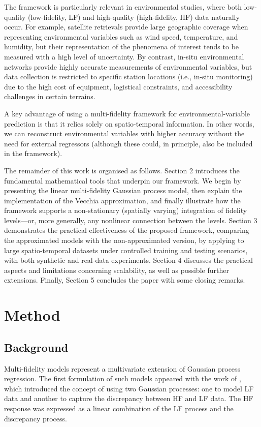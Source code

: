\documentclass[12pt]{article}
\begin{document}
The framework is particularly relevant in environmental studies, where both low-quality (low-fidelity, LF) and high-quality (high-fidelity, HF) data naturally occur. For example, satellite retrievals provide large geographic coverage when representing environmental variables such as wind speed, temperature, and humidity, but their representation of the phenomena of interest tends to be measured with a high level of uncertainty. By contrast, in-situ environmental networks provide highly accurate measurements of environmental variables, but data collection is restricted to specific station locations (i.e., in-situ monitoring) due to the high cost of equipment, logistical constraints, and accessibility challenges in certain terrains.

\noindent
\hangindent=-5mm
A key advantage of using a multi-fidelity framework for environmental-variable prediction is that it relies solely on spatio-temporal information. In other words, we can reconstruct environmental variables with higher accuracy without the need for external regressors (although these could, in principle, also be included in the framework).

\noindent
\hangindent=-5mm
The remainder of this work is organised as follows. Section 2 introduces the fundamental mathematical tools that underpin our framework. We begin by presenting the linear multi-fidelity Gaussian process model, then explain the implementation of the Vecchia approximation, and finally illustrate how the framework supports a non-stationary (spatially varying) integration of fidelity levels—or, more generally, any nonlinear connection between the levels. Section 3 demonstrates the practical effectiveness of the proposed framework, comparing the approximated models with the non-approximated version, by applying to large spatio-temporal datasets under controlled training and testing scenarios, with both synthetic and real-data experiments. Section 4 discusses the practical aspects and limitations concerning scalability, as well as possible further extensions. Finally, Section 5 concludes the paper with some closing remarks.



\section{Method}
\subsection{Background} \label{MFmodel}
Multi-fidelity models represent a multivariate extension of Gaussian process regression. The first formulation of such models appeared with the work of \cite{Kennedy2000}, which introduced the concept of using two Gaussian processes: one to model LF data and another to capture the discrepancy between HF and LF data. The HF response was expressed as a linear combination of the LF process and the discrepancy process.
\end{document}
